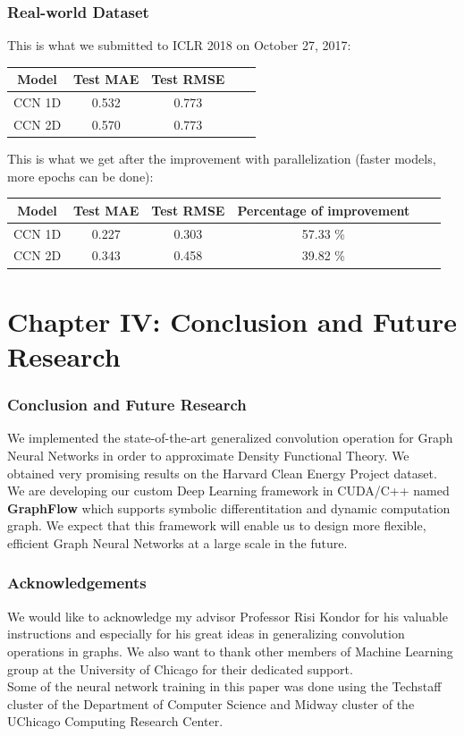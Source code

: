 \documentclass{beamer}
\begin{document}
\begin{frame}
\frametitle{Real-world Dataset}
This is what we submitted to ICLR 2018 on October 27, 2017:
\begin{center}
\begin{tabular}{||c | c | c | c | c ||}
	\hline
	Model & Test MAE & Test RMSE \\ 
	\hline
	CCN 1D & 0.532 & 0.773 \\
	\hline
	CCN 2D & 0.570 & 0.773 \\
	\hline
\end{tabular}
\end{center}
This is what we get after the improvement with parallelization (faster models, more epochs can be done):
\begin{center}
\begin{tabular}{||c | c | c | c | c | c ||}
	\hline
	Model & Test MAE & Test RMSE & Percentage of improvement\\ 
	\hline
	CCN 1D & 0.227 & 0.303 & 57.33 \% \\
	\hline
	CCN 2D & 0.343 & 0.458 & 39.82 \% \\
	\hline
\end{tabular}
\end{center}
\end{frame}

\section{Chapter IV: Conclusion and Future Research}

\begin{frame}
\frametitle{Conclusion and Future Research}
\begin{justify}
We implemented the state-of-the-art generalized convolution operation for Graph Neural Networks in order to approximate Density Functional Theory. We obtained very promising results on the Harvard Clean Energy Project dataset.
$$$$
We are developing our custom Deep Learning framework in CUDA/C++ named \textbf{GraphFlow} which supports symbolic differentitation and dynamic computation graph. We expect that this framework will enable us to design more flexible, efficient Graph Neural Networks at a large scale in the future.
\end{justify}
\end{frame}

\begin{frame}
\frametitle{Acknowledgements}
\begin{justify}
We would like to acknowledge my advisor Professor Risi Kondor for his valuable instructions and especially for his great ideas in generalizing convolution operations in graphs. We also want to thank other members of Machine Learning group at the University of Chicago for their dedicated support.
$$$$
Some of the neural network training in this paper was done using the Techstaff cluster of the Department of Computer Science and Midway cluster of the UChicago Computing Research Center.
\end{justify}
\end{frame}
\end{document}
